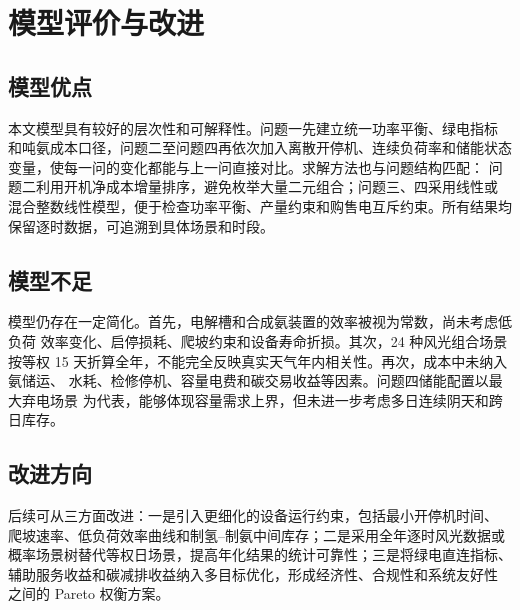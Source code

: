 \section{模型评价与改进}

\subsection{模型优点}

本文模型具有较好的层次性和可解释性。问题一先建立统一功率平衡、绿电指标
和吨氨成本口径，问题二至问题四再依次加入离散开停机、连续负荷率和储能状态
变量，使每一问的变化都能与上一问直接对比。求解方法也与问题结构匹配：
问题二利用开机净成本增量排序，避免枚举大量二元组合；问题三、四采用线性或
混合整数线性模型，便于检查功率平衡、产量约束和购售电互斥约束。所有结果均
保留逐时数据，可追溯到具体场景和时段。

\subsection{模型不足}

模型仍存在一定简化。首先，电解槽和合成氨装置的效率被视为常数，尚未考虑低负荷
效率变化、启停损耗、爬坡约束和设备寿命折损。其次，24 种风光组合场景按等权
15 天折算全年，不能完全反映真实天气年内相关性。再次，成本中未纳入氨储运、
水耗、检修停机、容量电费和碳交易收益等因素。问题四储能配置以最大弃电场景
为代表，能够体现容量需求上界，但未进一步考虑多日连续阴天和跨日库存。

\subsection{改进方向}

后续可从三方面改进：一是引入更细化的设备运行约束，包括最小开停机时间、
爬坡速率、低负荷效率曲线和制氢--制氨中间库存；二是采用全年逐时风光数据或
概率场景树替代等权日场景，提高年化结果的统计可靠性；三是将绿电直连指标、
辅助服务收益和碳减排收益纳入多目标优化，形成经济性、合规性和系统友好性
之间的 Pareto 权衡方案。
